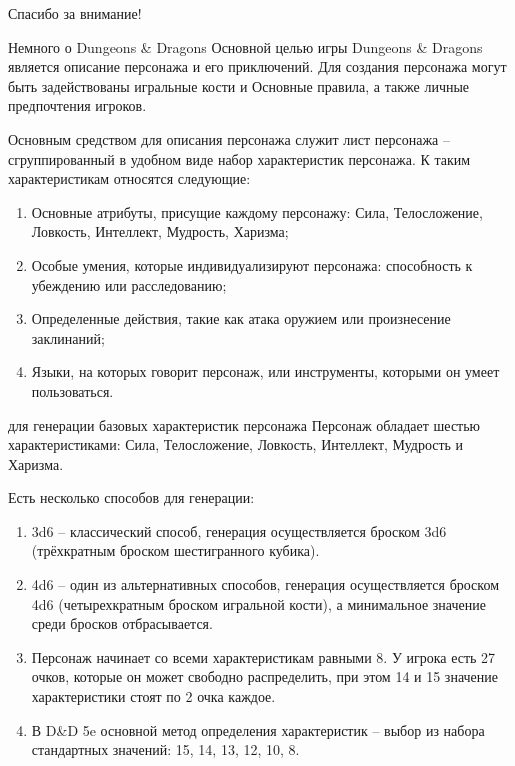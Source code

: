 \documentclass[12pt,a4paper,mathserif]{beamer}
\begin{document}
\begin{frame}
    \centering Спасибо за внимание!
\end{frame}

\begin{frame}{Немного о Dungeons \& Dragons}
    \setlength{\parindent}{0.5cm}
    Основной целью игры Dungeons \& Dragons является описание персонажа и его приключений. Для создания персонажа могут быть задействованы игральные кости и Основные правила, а также личные предпочтения игроков.

    Основным средством для описания персонажа  служит лист персонажа -- сгруппированный в удобном виде набор характеристик персонажа. К таким характеристикам относятся следующие:

    \begin{enumerate}
        \item Основные атрибуты, присущие каждому персонажу: Сила, Телосложение, Ловкость, Интеллект, Мудрость, Харизма;
    
        \item Особые умения, которые индивидуализируют персонажа: способность к убеждению или расследованию;
    
        \item Определенные действия, такие как атака оружием или произнесение заклинаний;
    
        \item Языки, на которых говорит персонаж, или инструменты, которыми он умеет пользоваться.
    \end{enumerate}
\end{frame}

\begin{frame}{ для генерации базовых характеристик персонажа}
    \setlength{\parindent}{0.5cm}
    Персонаж обладает шестью характеристиками: Сила, Телосложение, Ловкость, Интеллект, Мудрость и Харизма.
    
    Есть несколько способов для генерации:

    \begin{enumerate}
        \item 3d6 -- классический способ, генерация осуществляется броском 3d6 (трёхкратным броском шестигранного кубика).

        \item 4d6 -- один из альтернативных способов, генерация осуществляется броском 4d6 (четырехкратным броском игральной кости), а минимальное значение среди бросков отбрасывается.

        \item Персонаж начинает со всеми характеристикам равными 8. У игрока есть 27 очков, которые он может свободно распределить, при этом 14 и 15 значение характеристики стоят по 2 очка каждое.

        \item В D\&D 5e основной метод определения характеристик -- выбор из набора стандартных значений: 15, 14, 13, 12, 10, 8.
    \end{enumerate}
\end{frame}
\end{document}
